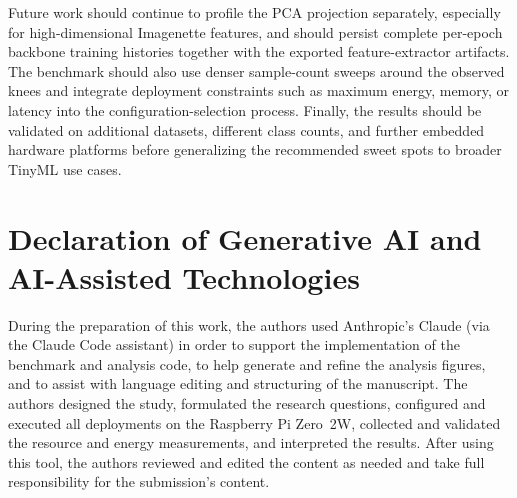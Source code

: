 \documentclass[sigconf,review,nonacm]{acmart}
\begin{document}
Future work should continue to profile the PCA projection separately, especially for high-dimensional Imagenette features, and should persist complete per-epoch backbone training histories together with the exported feature-extractor artifacts.
The benchmark should also use denser sample-count sweeps around the observed knees and integrate deployment constraints such as maximum energy, memory, or latency into the configuration-selection process.
Finally, the results should be validated on additional datasets, different class counts, and further embedded hardware platforms before generalizing the recommended sweet spots to broader TinyML use cases.

\section*{Declaration of Generative AI and AI-Assisted Technologies}
During the preparation of this work, the authors used Anthropic's Claude (via the Claude Code assistant) in order to support the implementation of the benchmark and analysis code, to help generate and refine the analysis figures, and to assist with language editing and structuring of the manuscript.
The authors designed the study, formulated the research questions, configured and executed all deployments on the Raspberry Pi Zero~2W, collected and validated the resource and energy measurements, and interpreted the results.
After using this tool, the authors reviewed and edited the content as needed and take full responsibility for the submission's content.



\end{document}

